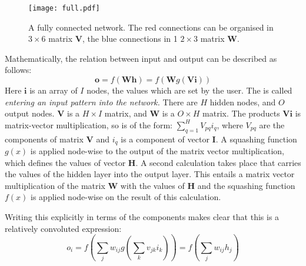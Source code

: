     \begin{figure}[!ht]
      \begin{center}
        \texttt{[image: full.pdf]}
       \end{center}
      \caption{A fully connected network. The red connections can be organised
      in $3\times 6$ matrix $\boldsymbol{V}$, the blue connections in 1 $2 \times 3$ matrix $\boldsymbol{W}$.}
      \label{fig-connected}
    \end{figure}

    Mathematically, the relation between input and output can be described as follows:
    \begin{equation}
      \boldsymbol{o} = f( \boldsymbol{W} \boldsymbol{h} ) = f(\boldsymbol{W} g(\boldsymbol{V} \boldsymbol{i}))
    \end{equation}
    Here $\boldsymbol{i}$ is an array of $I$ nodes, the values which are set by the user. The is called \emph{entering an input pattern into the network.}
    There are $H$ hidden nodes, and $O$ output nodes. $\boldsymbol{V}$ is a $H \times I$ matrix, and $\boldsymbol{W}$ is a $O \times H$ matrix.
    The products $\boldsymbol{V} \boldsymbol{i}$ is matrix-vector multiplication, so is of the form: $ \sum^{H}_{q=1} V_{pq} i_q$, where
    $V_{pq}$ are the components of matrix $\boldsymbol{V}$ and $i_q$ is a component of vector $\boldsymbol{I}$. A squashing function $g(x)$ is applied node-wise
    to the output of the matrix vector multiplication, which defines the values of vector $\boldsymbol{H}$. A second calculation takes place that carries the
    values of the hidden layer into the output layer. This entails a matrix vector multiplication of the matrix $\boldsymbol{W}$ with the values of $\boldsymbol{H}$
    and the squashing function $f(x)$ is applied node-wise on the result of this calculation.

    Writing this explicitly in terms of the components makes clear that this is a relatively convoluted expression:
    \begin{equation}
      o_i = f( \sum_{j} w_{ij}g(\sum_k v_{jk} i_k)) = f(\sum_j w_{ij}h_j)
      \label{eq-update}
    \end{equation}


